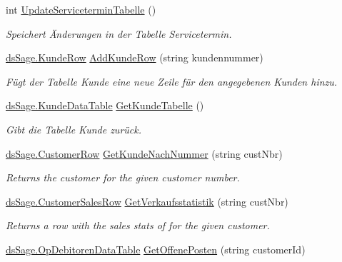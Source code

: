 \begin{DoxyCompactItemize}
int \hyperlink{class_products_1_1_data_1_1_data_service_a27c3aa0aebe407a18562584ce356aaa6}{Update\+Servicetermin\+Tabelle} ()
\begin{DoxyCompactList}\small\item\em Speichert Änderungen in der Tabelle Servicetermin. \end{DoxyCompactList}\item 
\hyperlink{class_products_1_1_data_1_1ds_sage_1_1_kunde_row}{ds\+Sage.\+Kunde\+Row} \hyperlink{class_products_1_1_data_1_1_data_service_a0da87c069e7b8713f9061df68eefe036}{Add\+Kunde\+Row} (string kundennummer)
\begin{DoxyCompactList}\small\item\em Fügt der Tabelle Kunde eine neue Zeile für den angegebenen Kunden hinzu. \end{DoxyCompactList}\item 
\hyperlink{class_products_1_1_data_1_1ds_sage_1_1_kunde_data_table}{ds\+Sage.\+Kunde\+Data\+Table} \hyperlink{class_products_1_1_data_1_1_data_service_a7a8825fec05b16ad77c79151cf8d4a26}{Get\+Kunde\+Tabelle} ()
\begin{DoxyCompactList}\small\item\em Gibt die Tabelle Kunde zurück. \end{DoxyCompactList}\item 
\hyperlink{class_products_1_1_data_1_1ds_sage_1_1_customer_row}{ds\+Sage.\+Customer\+Row} \hyperlink{class_products_1_1_data_1_1_data_service_a05d88f0d6ebe42f222cee3b7bd14194c}{Get\+Kunde\+Nach\+Nummer} (string cust\+Nbr)
\begin{DoxyCompactList}\small\item\em Returns the customer for the given customer number. \end{DoxyCompactList}\item 
\hyperlink{class_products_1_1_data_1_1ds_sage_1_1_customer_sales_row}{ds\+Sage.\+Customer\+Sales\+Row} \hyperlink{class_products_1_1_data_1_1_data_service_af31eeee62fe2cb6a4a34b3f7f479ba49}{Get\+Verkaufsstatistik} (string cust\+Nbr)
\begin{DoxyCompactList}\small\item\em Returns a row with the sales stats of for the given customer. \end{DoxyCompactList}\item 
\hyperlink{class_products_1_1_data_1_1ds_sage_1_1_op_debitoren_data_table}{ds\+Sage.\+Op\+Debitoren\+Data\+Table} \hyperlink{class_products_1_1_data_1_1_data_service_aa21176d376bb0d8ad37d1071e0197423}{Get\+Offene\+Posten} (string customer\+Id)

\end{DoxyCompactItemize}
